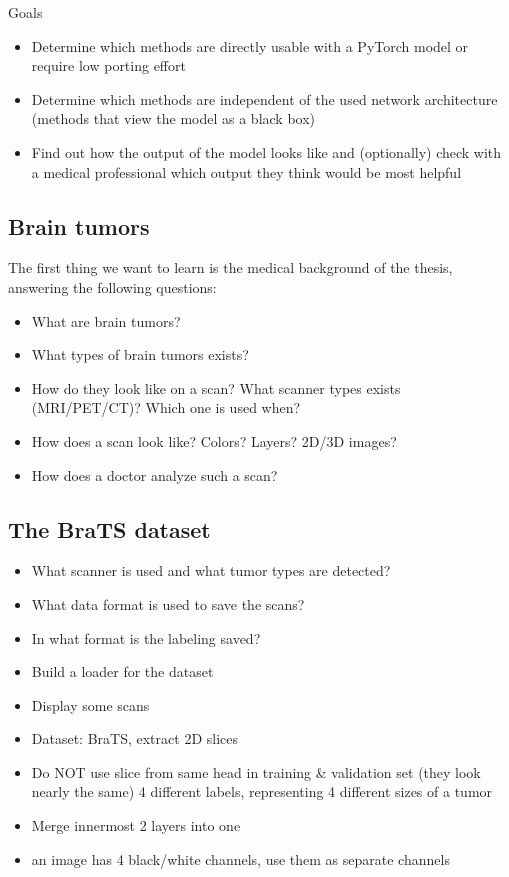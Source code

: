 Goals
\begin{itemize}
    \item Determine which methods are directly usable with a PyTorch model or require low porting effort
    \item Determine which methods are independent of the used network architecture (methods that view the model as a black box)
    \item Find out how the output of the model looks like and (optionally) check with a medical professional which output they think would be most helpful
\end{itemize}


\subsection{Brain tumors}
The first thing we want to learn is the medical background of the thesis, answering the following questions:
\begin{itemize}
    \item What are brain tumors?
    \item What types of brain tumors exists?
    \item How do they look like on a scan? What scanner types exists (MRI/PET/CT)? Which one is used when?
    \item How does a scan look like? Colors? Layers? 2D/3D images?
    \item How does a doctor analyze such a scan?
\end{itemize}

\subsection{The BraTS dataset}
\begin{itemize}
    \item What scanner is used and what tumor types are detected?
    \item What data format is used to save the scans?
    \item In what format is the labeling saved?
    \item Build a loader for the dataset
    \item Display some scans
    \item Dataset: BraTS, extract 2D slices
    \item Do NOT use slice from same head in training \& validation set (they look nearly the same) 4 different labels, representing 4 different sizes of a tumor
    \item Merge innermost 2 layers into one
    \item an image has 4 black/white channels, use them as separate channels
\end{itemize}

